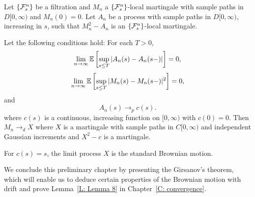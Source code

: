 \begin{theorem} \label{T: functional CLT martingales}
	Let $\{\mathcal{F}^n_{s}\}$ be a filtration and $M_n$ a $\{\mathcal{F}^n_{s}\}$-local martingale with sample paths in $D[0,\infty)$ and $M_n(0)=0$.
	Let $A_n$ be a process with sample paths in $D[0,\infty)$, increasing in $s$, such that $M_n^2 - A_n$ is an $\{\mathcal{F}^n_{s}\}$-local martingale.
	
	Let the following conditions hold:
	For each $T>0$,
	\begin{equation} \label{E: cond1 CLT}
	\lim_{n\rightarrow\infty} \mathbb{E} \left[ 
		\sup_{s \leq T} | A_n(s) - A_n(s-)|
	 \right] = 0,
	\end{equation}
	\begin{equation} \label{E: cond2 CLT}
	\lim_{n\rightarrow\infty} \mathbb{E} \left[ 
		\sup_{s \leq T} | M_n(s) - M_n(s-)|^2
	 \right] = 0,
	\end{equation}
	and 
	\begin{equation} \label{E: cond3 CLT}
	A_n(s) \rightarrow_p c(s).
	\end{equation}
	where $c(s)$ is a continuous, increasing function on $[0, \infty)$ with $c(0) = 0$.
	Then $M_n \rightarrow_d X$ where $X$ is a martingale with sample paths in $C[0,\infty)$ and independent Gaussian increments
	and $X^2 - c$ is a martingale.
\end{theorem}

For $c(s) = s$, the limit process $X$ is the standard Brownian motion.

We conclude this preliminary chapter by presenting the Girsanov's theorem,
which will enable us to deduce certain properties of the Brownian motion with drift
and prove Lemma~\ref{L: Lemma 8} in Chapter~\ref{C: convergence}.

